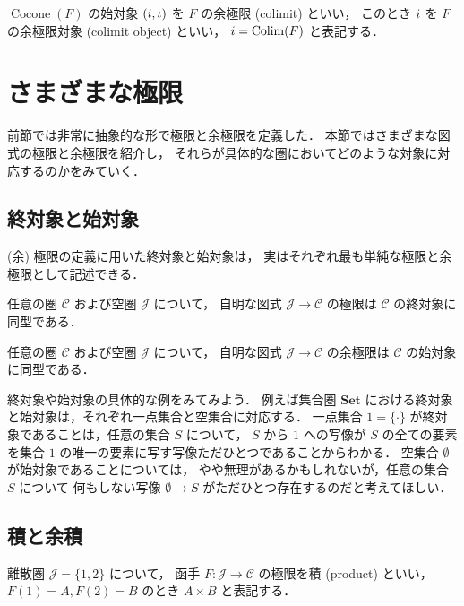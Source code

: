 \documentclass[titlepage]{ltjsreport}
\newcommand{\cat}[1]{\mathscr{#1}}
\newcommand{\obj}[1]{\lowercase{#1}}
\newcommand{\set}{\mathbf{Set}}
\DeclareMathOperator{\colim}{Colim}
\DeclareMathOperator{\cocone}{Cocone}
\begin{document}
\begin{definition}[余極限]
  $\cocone(F)$ の始対象 $(\obj{i},\iota)$ を $F$ の余極限 (colimit) といい，
  このとき $\obj{i}$ を $F$ の余極限対象 (colimit object) といい，
  $\obj{i}=\colim(F)$ と表記する．
\end{definition}

\section{さまざまな極限}

前節では非常に抽象的な形で極限と余極限を定義した．
本節ではさまざまな図式の極限と余極限を紹介し，
それらが具体的な圏においてどのような対象に対応するのかをみていく．

\subsection{終対象と始対象}

(余) 極限の定義に用いた終対象と始対象は，
実はそれぞれ最も単純な極限と余極限として記述できる．
\begin{theorem}[極限としての終対象]
  任意の圏 $\cat{C}$ および空圏 $\cat{J}$ について，
  自明な図式 $\cat{J}\to\cat{C}$ の極限は
  $\cat{C}$ の終対象に同型である．
\end{theorem}
\begin{theorem}[余極限としての始対象]
  任意の圏 $\cat{C}$ および空圏 $\cat{J}$ について，
  自明な図式 $\cat{J}\to\cat{C}$ の余極限は
  $\cat{C}$ の始対象に同型である．
\end{theorem}
終対象や始対象の具体的な例をみてみよう．
例えば集合圏 $\set$ における終対象と始対象は，それぞれ一点集合と空集合に対応する．
一点集合 $1=\{\cdot\}$ が終対象であることは，任意の集合 $S$ について，
$S$ から $1$ への写像が $S$ の全ての要素を集合 $1$ の唯一の要素に写す写像ただひとつであることからわかる．
空集合 $\emptyset$ が始対象であることについては，
やや無理があるかもしれないが，任意の集合 $S$ について
何もしない写像 $\emptyset\to S$ がただひとつ存在するのだと考えてほしい．

\subsection{積と余積}

\begin{definition}[積]
  離散圏 $\cat{J}=\{1,2\}$ について，
  函手 $F:\cat{J}\to\cat{C}$ の極限を積 (product) といい，
  $F(1)=A,F(2)=B$ のとき $A\times B$ と表記する．
  \begin{center}
  \end{center}
\end{definition}
\end{document}
